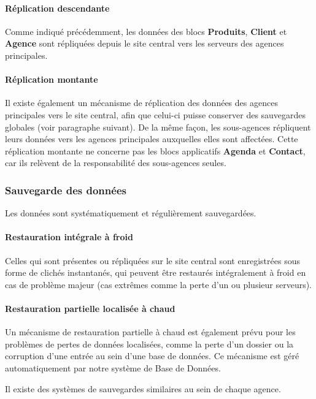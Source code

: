 \paragraph{Réplication descendante}

Comme indiqué précédemment, les données des blocs \textbf{Produits}, \textbf{Client} et \textbf{Agence}
sont répliquées depuis le site central vers les serveurs des agences principales.

\paragraph{Réplication montante}

Il existe également un mécanisme de réplication des données des agences principales vers le site central,
afin que celui-ci puisse conserver des sauvegardes globales (voir paragraphe suivant). De la même façon,
les sous-agences répliquent leurs données vers les agences principales auxquelles elles sont affectées.
Cette réplication montante ne concerne pas les blocs applicatifs \textbf{Agenda} et \textbf{Contact}, car
ils relèvent de la responsabilité des sous-agences seules.

\subsubsection{Sauvegarde des données}

Les données sont systématiquement et régulièrement sauvegardées.

\paragraph{Restauration intégrale à froid}

Celles qui sont présentes ou répliquées
sur le site central sont enregistrées sous forme de clichés instantanés, qui peuvent être restaurés
intégralement à froid en cas de problème majeur (cas extrêmes comme la perte d'un ou plusieur serveurs).

\paragraph{Restauration partielle localisée à chaud}

Un mécanisme de restauration partielle à chaud est également prévu pour
les problèmes de pertes de données localisées, comme la perte d'un dossier ou la corruption d'une entrée
au sein d'une base de données. Ce mécanisme est géré automatiquement par notre système de Base de Données.

Il existe des systèmes de sauvegardes similaires au sein de chaque agence.
